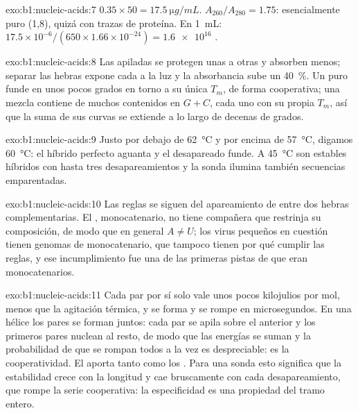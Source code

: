 \begin{solution}{exo:b1:nucleic-acids:7}
$0.35\times 50 = \qty{17.5}{\micro g/mL}$. $A_{260}/A_{280} = 1.75$: 
esencialmente puro (1,8), quizá con trazas de proteína. En \qty{1}{mL}:
$17.5\times 10^{-6}/(650\times 1.66\times 10^{-24}) =
\num{1.6e16}$ .
\end{solution}

\begin{solution}{exo:b1:nucleic-acids:8}
Las  apiladas se protegen unas a otras y absorben menos; separar las
hebras expone cada  a la luz y la absorbancia sube un \qty{40}{\%}. Un
 puro funde en unos pocos grados en torno a su única $T_m$, de forma
cooperativa; una mezcla contiene  de muchos contenidos en $G + C$, cada
uno con su propia $T_m$, así que la suma de sus curvas se extiende a lo
largo de decenas de grados.
\end{solution}

\begin{solution}{exo:b1:nucleic-acids:9}
Justo por debajo de \qty{62}{\celsius} y por encima de \qty{57}{\celsius},
digamos \qty{60}{\celsius}: el híbrido perfecto aguanta y el desapareado
funde. A \qty{45}{\celsius} son estables híbridos con hasta tres
desapareamientos y la sonda ilumina también secuencias emparentadas.
\end{solution}

\begin{solution}{exo:b1:nucleic-acids:10}
Las reglas se siguen del apareamiento de  entre dos hebras
complementarias. El , monocatenario, no tiene compañera que restrinja su
composición, de modo que en general $A \neq U$; los virus pequeños en
cuestión tienen genomas de  monocatenario, que tampoco tienen por qué
cumplir las reglas, y ese incumplimiento fue una de las primeras pistas de
que eran monocatenarios.
\end{solution}

\begin{solution}{exo:b1:nucleic-acids:11}
Cada par por sí solo vale unos pocos kilojulios por mol, menos que la
agitación térmica, y se forma y se rompe en microsegundos. En una hélice los
pares se forman juntos: cada par se apila sobre el anterior y los primeros
pares nuclean al resto, de modo que las energías se suman y la probabilidad
de que se rompan todos a la vez es despreciable: es la cooperatividad. El
 aporta tanto como los . Para una sonda esto
significa que la estabilidad crece con la longitud y cae bruscamente con
cada desapareamiento, que rompe la serie cooperativa: la especificidad es
una propiedad del tramo entero.
\end{solution}

